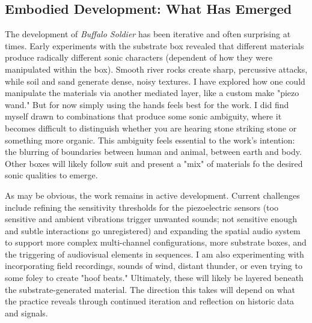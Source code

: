 \subsection{Embodied Development: What Has Emerged}

The development of \emph{Buffalo Soldier} has been iterative and often surprising at times. Early experiments with the substrate box revealed that different materials produce radically different sonic characters (dependent of how they were manipulated within the box). Smooth river rocks create sharp, percussive attacks, while soil and sand generate dense, noisy textures. I have explored how one could manipulate the materials via another mediated layer, like a custom make "piezo wand." But for now simply using the hands feels best for the work. I did find myself drawn to combinations that produce some sonic ambiguity, where it becomes difficult to distinguish whether you are hearing stone striking stone or something more organic. This ambiguity feels essential to the work's intention: the blurring of boundaries between human and animal, between earth and body. Other boxes will likely follow suit and present a "mix" of materials fo the desired sonic qualities to emerge.

As may be obvious, the work remains in active development. Current challenges include refining the sensitivity thresholds for the piezoelectric sensors (too sensitive and ambient vibrations trigger unwanted sounds; not sensitive enough and subtle interactions go unregistered) and expanding the spatial audio system to support more complex multi-channel configurations, more substrate boxes, and the triggering of audiovisual elements in sequences. I am also experimenting with incorporating field recordings, sounds of wind, distant thunder, or even trying to some foley to create "hoof beats." Ultimately, these will likely be layered beneath the substrate-generated material. The direction this takes will depend on what the practice reveals through continued iteration and reflection on historic data and signals.

